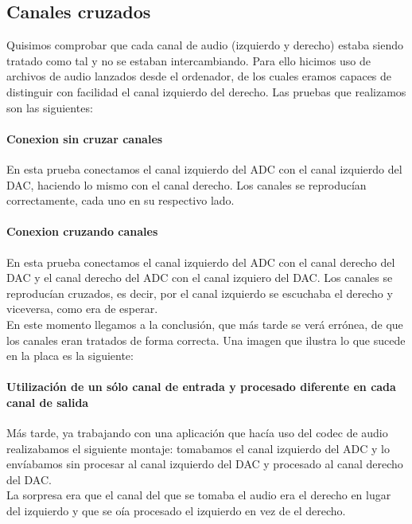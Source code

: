 	

	\subsection{Canales cruzados}

		Quisimos comprobar que cada canal de audio (izquierdo y derecho) estaba siendo tratado como tal y no se estaban intercambiando. Para ello hicimos uso de archivos de audio lanzados desde el ordenador, de los cuales eramos capaces de distinguir con facilidad el canal izquierdo del derecho. Las pruebas que realizamos son las siguientes:

		\paragraph{Conexion sin cruzar canales}
			En esta prueba conectamos el canal izquierdo del ADC con el canal izquierdo del DAC, haciendo lo mismo con el canal derecho. Los canales se reproducían correctamente, cada uno en su respectivo lado.


		\paragraph{Conexion cruzando canales}
			En esta prueba conectamos el canal izquierdo del ADC con el canal derecho del DAC y el canal derecho del ADC con el canal izquiero del DAC. Los canales se reproducían cruzados, es decir, por el canal izquierdo se escuchaba el derecho y viceversa, como era de esperar.\\

En este momento llegamos a la conclusión, que más tarde se verá errónea, de que los canales eran tratados de forma correcta. Una imagen que ilustra lo que sucede en la placa es la siguiente:


		\paragraph{Utilización de un sólo canal de entrada y procesado diferente en cada canal de salida}
	
			Más tarde, ya trabajando con una aplicación que hacía uso del codec de audio realizabamos el siguiente montaje: tomabamos el canal izquierdo del ADC y lo envíabamos sin procesar al canal izquierdo del DAC y procesado al canal derecho del DAC.\\

La sorpresa era que el canal del que se tomaba el audio era el derecho en lugar del izquierdo y que se oía procesado el izquierdo en vez de el derecho.\\

